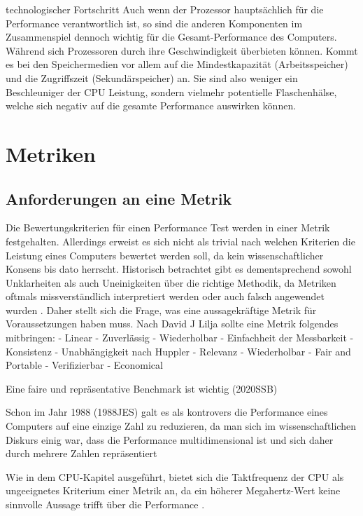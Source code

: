 technologischer Fortschritt
Auch wenn der Prozessor hauptsächlich für die Performance verantwortlich ist, so sind die anderen Komponenten im Zusammenspiel dennoch wichtig für die Gesamt-Performance des Computers.
Während sich Prozessoren durch ihre Geschwindigkeit überbieten können. Kommt es bei den Speichermedien vor allem auf die Mindestkapazität (Arbeitsspeicher) und die Zugriffszeit (Sekundärspeicher) an. Sie sind also weniger ein Beschleuniger der CPU Leistung, sondern vielmehr potentielle Flaschenhälse, welche sich negativ auf die gesamte Performance auswirken können.


\section{Metriken}
\label{sec:metrics}

\subsection{Anforderungen an eine Metrik}
\label{subsec:metrics}

Die Bewertungskriterien für einen Performance Test werden in einer Metrik festgehalten. Allerdings erweist es sich nicht als trivial nach welchen Kriterien die Leistung eines Computers bewertet werden soll, da kein wissenschaftlicher Konsens bis dato herrscht. Historisch betrachtet gibt es dementsprechend sowohl Unklarheiten als auch Uneinigkeiten über die richtige Methodik, da Metriken oftmals missverständlich interpretiert werden oder auch falsch angewendet wurden \cite{djl2005}. Daher stellt sich die Frage, was eine aussagekräftige Metrik für Voraussetzungen haben muss. 
Nach David J Lilja sollte eine Metrik folgendes mitbringen:
- Linear
- Zuverlässig 
- Wiederholbar
- Einfachheit der Messbarkeit
- Konsistenz
- Unabhängigkeit
nach Huppler 
- Relevanz
- Wiederholbar
- Fair and Portable
- Verifizierbar
- Economical

Eine faire und repräsentative Benchmark ist wichtig \cite{kounev2020} (2020SSB)

Schon im Jahr 1988 \cite{smith1988} (1988JES) galt es als kontrovers die Performance eines Computers auf eine einzige Zahl zu reduzieren, da man sich im wissenschaftlichen Diskurs einig war, dass die Performance multidimensional ist und sich daher durch mehrere Zahlen repräsentiert \cite{smith1988}

Wie in dem CPU-Kapitel ausgeführt, bietet sich die Taktfrequenz der CPU als ungeeignetes Kriterium einer Metrik an, da ein höherer Megahertz-Wert keine sinnvolle Aussage trifft über die Performance \cite{djl2005}. 


